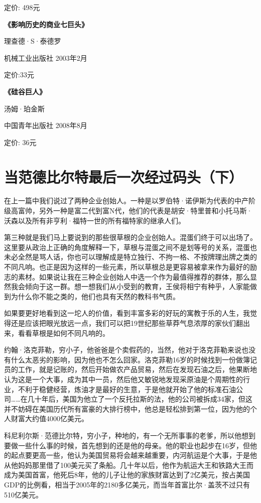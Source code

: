 定价: 498元

\textbf{《影响历史的商业七巨头》}

理查德·S·泰德罗

机械工业出版社 2003年2月

定价:33元

\textbf{《硅谷巨人》}

汤姆·珀金斯

中国青年出版社 2008年8月

定价: 36元

\section{当范德比尔特最后一次经过码头（下）}

在上一篇中我们说过了两种企业创始人。一种是以罗伯特·诺伊斯为代表的中产阶级高富帅，另外一种是富二代到富N代，他们的代表是胡安·特里普和小托马斯·沃森以及所有非亨利·福特一世的所有福特家的继承人们。

第三种就是我们马上要说到的那些很草根的企业创始人。混蛋们终于可以出场了。这里要从政治上正确的角度解释一下，草根与混蛋之间不是划等号的关系，混蛋也未必全然是骂人话，你也可以理解成是特立独行、不拘一格、不按牌理出牌之类的不同凡响。也正是因为这样的一些元素，所以草根总是更容易被拿来作为最好的励志的素材。如果说让我在三种企业创始人中选一个作为最值得推荐的群体，那么显然我会倾向于这一群。想一想我们从小受到的教育，王侯将相宁有种乎，人家能做到为什么你不能之类的，他们也具有天然的教科书气质。

如果要更好地看到这一坨人的价值，看到丰富多彩的好玩的寓教于乐的人生，我觉得还是应该把眼光放远一点，我们可以把19世纪那些草莽气息浓厚的家伙们翻出来，看看草根是如何不同凡响的。

约翰·洛克菲勒，穷小子，他爸爸是个卖假药的，当然，他对于洛克菲勒来说也没有什么太恶劣的影响，因为他也不怎么回家。洛克菲勒16岁的时候找到一份做簿记员的工作，就是记账的，然后开始做农产品贸易，然后在发现石油之后，他果断地认为这是一个大事，成为其中一员，然后他又敏锐地发现采原油是个周期性的行业，不利于稳健经营，炼油才是最好的生意，于是他就开始了他的标准石油公司\ldots{}\ldots{}在几十年后，美国为他立了一个反托拉斯的法，他的公司被拆成34家，但这并不妨碍在美国历代所有富豪的大排行榜中，他总是轻松排到第一位，因为他的个人财富大约值4000亿美元。

科尼利尔斯·范德比尔特，穷小子，种地的，有一个无所事事的老爹，所以他想到要做一些什么事的时候，首先想到的还是他的母亲。他的职业也起步在16岁，但他的起点要更高一些，他认为美国贸易将会越来越重要，内河航运是个大事，于是他从他妈妈那里借了100美元买了条船。几十年以后，他作为航运大王和铁路大王而成为美国首富，他死后8年，他的儿子让他的家族财富达到了2亿美元，按占美国GDP的比例看，相当于2005年的2180多亿美元，而当年首富比尔·盖茨不过只有510亿美元。

